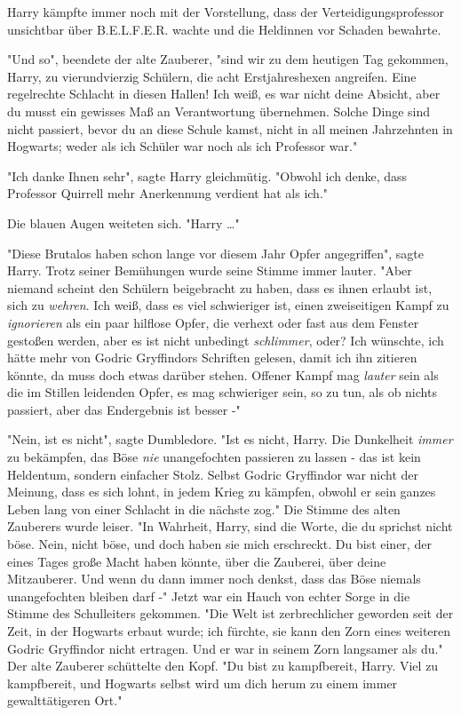 {Harry kämpfte immer noch mit der Vorstellung, dass der Verteidigungsprofessor unsichtbar über B.E.L.F.E.R. wachte und die Heldinnen vor Schaden bewahrte.

"Und so", beendete der alte Zauberer, "sind wir zu dem heutigen Tag gekommen, Harry, zu vierundvierzig Schülern, die acht Erstjahreshexen angreifen. Eine regelrechte Schlacht in diesen Hallen! Ich weiß, es war nicht deine Absicht, aber du musst ein gewisses Maß an Verantwortung übernehmen. Solche Dinge sind nicht passiert, bevor du an diese Schule kamst, nicht in all meinen Jahrzehnten in Hogwarts; weder als ich Schüler war noch als ich Professor war."

"Ich danke Ihnen sehr", sagte Harry gleichmütig. "Obwohl ich denke, dass Professor Quirrell mehr Anerkennung verdient hat als ich."

Die blauen Augen weiteten sich. "Harry …"

"Diese Brutalos haben schon lange vor diesem Jahr Opfer angegriffen", sagte Harry. Trotz seiner Bemühungen wurde seine Stimme immer lauter. "Aber niemand scheint den Schülern beigebracht zu haben, dass es ihnen erlaubt ist, sich zu \emph{wehren}. Ich weiß, dass es viel schwieriger ist, einen zweiseitigen Kampf zu \emph{ignorieren} als ein paar hilflose Opfer, die verhext oder fast aus dem Fenster gestoßen werden, aber es ist nicht unbedingt \emph{schlimmer}, oder? Ich wünschte, ich hätte mehr von Godric Gryffindors Schriften gelesen, damit ich ihn zitieren könnte, da muss doch etwas darüber stehen. Offener Kampf mag \emph{lauter} sein als die im Stillen leidenden Opfer, es mag schwieriger sein, so zu tun, als ob nichts passiert, aber das Endergebnis ist besser -"

"Nein, ist es nicht", sagte Dumbledore. "Ist es nicht, Harry. Die Dunkelheit \emph{immer} zu bekämpfen, das Böse \emph{nie} unangefochten passieren zu lassen - das ist kein Heldentum, sondern einfacher Stolz. Selbst Godric Gryffindor war nicht der Meinung, dass es sich lohnt, in jedem Krieg zu kämpfen, obwohl er sein ganzes Leben lang von einer Schlacht in die nächste zog." Die Stimme des alten Zauberers wurde leiser. "In Wahrheit, Harry, sind die Worte, die du sprichst nicht böse. Nein, nicht böse, und doch haben sie mich erschreckt. Du bist einer, der eines Tages große Macht haben könnte, über die Zauberei, über deine Mitzauberer. Und wenn du dann immer noch denkst, dass das Böse niemals unangefochten bleiben darf -" Jetzt war ein Hauch von echter Sorge in die Stimme des Schulleiters gekommen. "Die Welt ist zerbrechlicher geworden seit der Zeit, in der Hogwarts erbaut wurde; ich fürchte, sie kann den Zorn eines weiteren Godric Gryffindor nicht ertragen. Und er war in seinem Zorn langsamer als du." Der alte Zauberer schüttelte den Kopf. "Du bist zu kampfbereit, Harry. Viel zu kampfbereit, und Hogwarts selbst wird um dich herum zu einem immer gewalttätigeren Ort."

}
